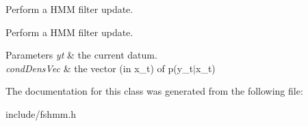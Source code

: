 Perform a H\+MM filter update. 

Perform a H\+MM filter update. 
\begin{DoxyParams}{Parameters}
{\em yt} & the current datum. \\
\hline
{\em cond\+Dens\+Vec} & the vector (in x\+\_\+t) of p(y\+\_\+t$\vert$x\+\_\+t) \\
\hline
\end{DoxyParams}


The documentation for this class was generated from the following file\+:\begin{DoxyCompactItemize}
\item 
include/fshmm.\+h\end{DoxyCompactItemize}
